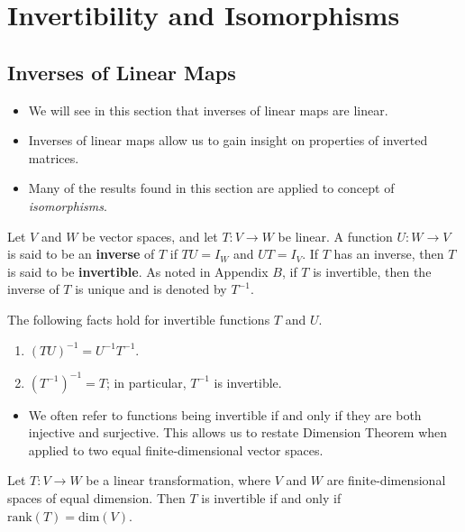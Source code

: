 \section{Invertibility and Isomorphisms}

\subsection{Inverses of Linear Maps}
\begin{itemize}
    \item We will see in this section that inverses of linear maps are linear.
    \item Inverses of linear maps allow us to gain insight on properties of inverted matrices.
    \item Many of the results found in this section are applied to concept of \textit{isomorphisms}. 
\end{itemize}

\begin{definition}
    Let \( V  \) and \( W  \) be vector spaces, and let \( T: V \to W  \) be linear. A function \( U: W \to V  \) is said to be an \textbf{inverse} of \( T  \) if \( TU = {I}_{W} \) and \( UT = {I}_{V} \). If \( T  \) has an inverse, then \( T  \) is said to be \textbf{invertible}. As noted in Appendix \( B  \), if \( T  \) is invertible, then the inverse of \( T  \) is unique and is denoted by \( T^{-1} \). 
\end{definition}

The following facts hold for invertible functions \( T  \) and \( U  \).
\begin{enumerate}
    \item \( (TU)^{-1} = U^{-1} T^{-1} \).
    \item \( (T^{-1})^{-1} = T  \); in particular, \( T^{-1}  \) is invertible.
\end{enumerate}

\begin{itemize}
    \item We often refer to functions being invertible if and only if they are both injective and surjective. This allows us to restate Dimension Theorem when applied to two equal finite-dimensional vector spaces.
\end{itemize}

\begin{theorem}
  Let \( T: V \to W  \) be a linear transformation, where \( V  \) and \( W  \) are finite-dimensional spaces of equal dimension. Then \( T  \) is invertible if and only if \( \text{rank}(T) = \text{dim}(V ) \).  
\end{theorem}

